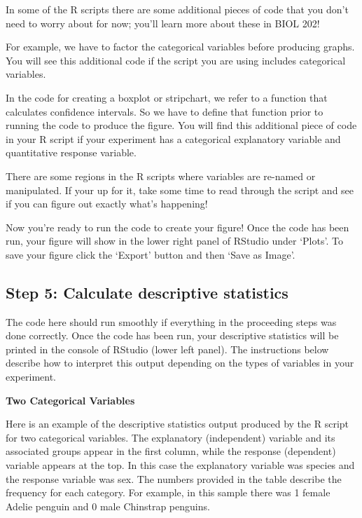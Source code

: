 \documentclass[
]{book}
\begin{document}
In some of the R scripts there are some additional pieces of code that you don't need to worry about for now; you'll learn more about these in BIOL 202!

For example, we have to factor the categorical variables before producing graphs. You will see this additional code if the script you are using includes categorical variables.

In the code for creating a boxplot or stripchart, we refer to a function that calculates confidence intervals. So we have to define that function prior to running the code to produce the figure. You will find this additional piece of code in your R script if your experiment has a categorical explanatory variable and quantitative response variable.

There are some regions in the R scripts where variables are re-named or manipulated. If your up for it, take some time to read through the script and see if you can figure out exactly what's happening!

Now you're ready to run the code to create your figure! Once the code has been run, your figure will show in the lower right panel of RStudio under `Plots'. To save your figure click the `Export' button and then `Save as Image'.

\hypertarget{step-5-calculate-descriptive-statistics}{%
\subsection*{Step 5: Calculate descriptive statistics}\label{step-5-calculate-descriptive-statistics}}

The code here should run smoothly if everything in the proceeding steps was done correctly. Once the code has been run, your descriptive statistics will be printed in the console of RStudio (lower left panel). The instructions below describe how to interpret this output depending on the types of variables in your experiment.

\textbf{Two Categorical Variables}

Here is an example of the descriptive statistics output produced by the R script for two categorical variables. The explanatory (independent) variable and its associated groups appear in the first column, while the response (dependent) variable appears at the top. In this case the explanatory variable was species and the response variable was sex. The numbers provided in the table describe the frequency for each category. For example, in this sample there was 1 female Adelie penguin and 0 male Chinstrap penguins.
\end{document}
